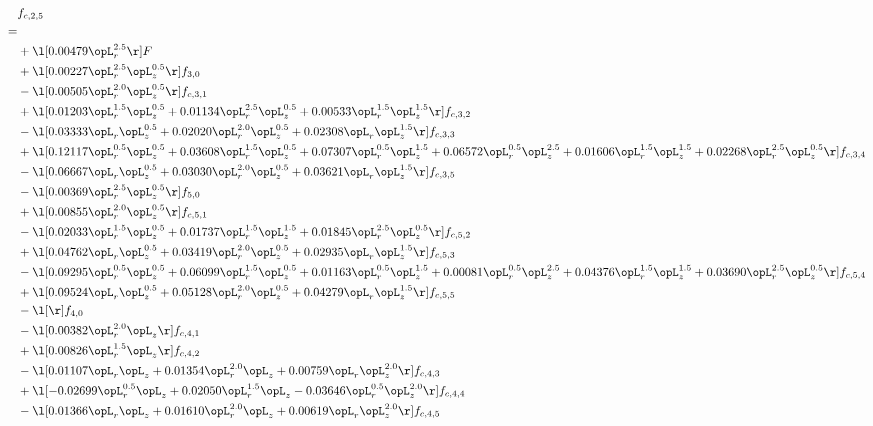 \begin{alignat}{2} 
\label{eq:f_25_2} 
& f_{c,2,5} \nonumber \\ 
 = \\ 
& + \l[  0.00479 \opL_r^{2.5}  \r] F \nonumber \\ 
& + \l[  0.00227 \opL_r^{2.5} \opL_z^{0.5}  \r] f_{3,0} \nonumber \\ 
& - \l[  0.00505 \opL_r^{2.0} \opL_z^{0.5}  \r] f_{c,3,1} \nonumber \\ 
& + \l[  0.01203 \opL_r^{1.5} \opL_z^{0.5} +  0.01134 \opL_r^{2.5} \opL_z^{0.5} +  0.00533 \opL_r^{1.5} \opL_z^{1.5}  \r] f_{c,3,2} \nonumber \\ 
& - \l[  0.03333 \opL_r \opL_z^{0.5} +  0.02020 \opL_r^{2.0} \opL_z^{0.5} +  0.02308 \opL_r \opL_z^{1.5}  \r] f_{c,3,3} \nonumber \\ 
& + \l[  0.12117 \opL_r^{0.5} \opL_z^{0.5} +  0.03608 \opL_r^{1.5} \opL_z^{0.5} +  0.07307 \opL_r^{0.5} \opL_z^{1.5} +  0.06572 \opL_r^{0.5} \opL_z^{2.5} +  0.01606 \opL_r^{1.5} \opL_z^{1.5} +  0.02268 \opL_r^{2.5} \opL_z^{0.5}  \r] f_{c,3,4} \nonumber \\ 
& - \l[  0.06667 \opL_r \opL_z^{0.5} +  0.03030 \opL_r^{2.0} \opL_z^{0.5} +  0.03621 \opL_r \opL_z^{1.5}  \r] f_{c,3,5} \nonumber \\ 
& - \l[  0.00369 \opL_r^{2.5} \opL_z^{0.5}  \r] f_{5,0} \nonumber \\ 
& + \l[  0.00855 \opL_r^{2.0} \opL_z^{0.5}  \r] f_{c,5,1} \nonumber \\ 
& - \l[  0.02033 \opL_r^{1.5} \opL_z^{0.5} +  0.01737 \opL_r^{1.5} \opL_z^{1.5} +  0.01845 \opL_r^{2.5} \opL_z^{0.5}  \r] f_{c,5,2} \nonumber \\ 
& + \l[  0.04762 \opL_r \opL_z^{0.5} +  0.03419 \opL_r^{2.0} \opL_z^{0.5} +  0.02935 \opL_r \opL_z^{1.5}  \r] f_{c,5,3} \nonumber \\ 
& - \l[  0.09295 \opL_r^{0.5} \opL_z^{0.5} +  0.06099 \opL_r^{1.5} \opL_z^{0.5} +  0.01163 \opL_r^{0.5} \opL_z^{1.5} +  0.00081 \opL_r^{0.5} \opL_z^{2.5} +  0.04376 \opL_r^{1.5} \opL_z^{1.5} +  0.03690 \opL_r^{2.5} \opL_z^{0.5}  \r] f_{c,5,4} \nonumber \\ 
& + \l[  0.09524 \opL_r \opL_z^{0.5} +  0.05128 \opL_r^{2.0} \opL_z^{0.5} +  0.04279 \opL_r \opL_z^{1.5}  \r] f_{c,5,5} \nonumber \\ 
& - \l[  \r] f_{4,0} \nonumber \\ 
& - \l[  0.00382 \opL_r^{2.0} \opL_z  \r] f_{c,4,1} \nonumber \\ 
& + \l[  0.00826 \opL_r^{1.5} \opL_z  \r] f_{c,4,2} \nonumber \\ 
& - \l[  0.01107 \opL_r \opL_z +  0.01354 \opL_r^{2.0} \opL_z +  0.00759 \opL_r \opL_z^{2.0}  \r] f_{c,4,3} \nonumber \\ 
& + \l[  -0.02699 \opL_r^{0.5} \opL_z +  0.02050 \opL_r^{1.5} \opL_z   -0.03646 \opL_r^{0.5} \opL_z^{2.0}  \r] f_{c,4,4} \nonumber \\ 
& - \l[  0.01366 \opL_r \opL_z +  0.01610 \opL_r^{2.0} \opL_z +  0.00619 \opL_r \opL_z^{2.0}  \r] f_{c,4,5} \nonumber \\ 
\end{alignat} 


